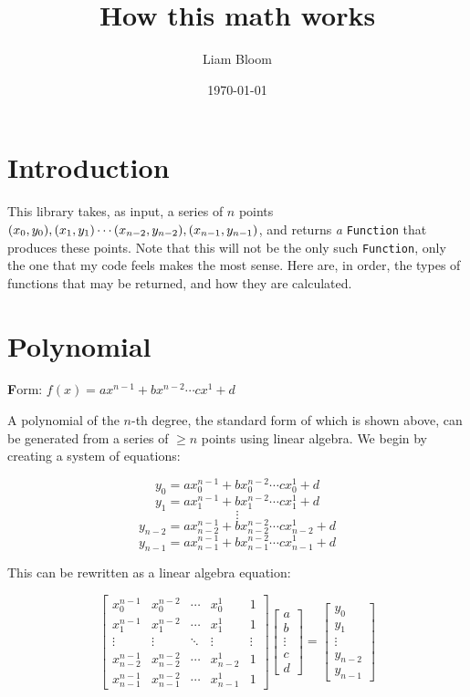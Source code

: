 \documentclass[12pt, letterpaper]{article}
\title{How this math works}
\author{Liam Bloom}
\date{\today}
\begin{document}
\tableofcontents

\section*{Introduction}

This library takes, as input, a series of $n$ points 
\((x_0, y_0), (x_1, y_1)\cdots \\(x_{n-2}, y_{n-2}), 
(x_{n-1}, y_{n-1})\), and returns {\textit a} \verb|Function| that 
produces these points. Note that this will not be the only such
\verb|Function|, only the one that my code feels makes the most sense. 
Here are, in order, the types of functions that may be returned, and
how they are calculated.

\section{Polynomial}

{\textbf Form:} \(f(x)=ax^{n-1}+bx^{n-2}\cdots cx^1+d\) \vspace{2ex}

A polynomial of the $n$-th degree, the standard form of which is shown
above, can be generated from a series of $\geq n$ points using linear
algebra. We begin by creating a system of equations:

\[y_0=ax_0^{n-1}+bx_0^{n-2}\cdots cx_0^1+d\]
\[y_1=ax_1^{n-1}+bx_1^{n-2}\cdots cx_1^1+d\]
\[\vdots\]
\[y_{n-2}=ax_{n-2}^{n-1}+bx_{n-2}^{n-2}\cdots cx_{n-2}^1+d\]
\[y_{n-1}=ax_{n-1}^{n-1}+bx_{n-1}^{n-2}\cdots cx_{n-1}^1+d\]

This can be rewritten as a linear algebra equation:

\[
    \begin{bmatrix} 
    x_0^{n-1} & x_0^{n-2} & \cdots & x_0^1 & 1 \\
    x_1^{n-1} & x_1^{n-2} & \cdots & x_1^1 & 1 \\
    \vdots & \vdots & \ddots & \vdots & \vdots \\
    x_{n-2}^{n-1} & x_{n-2}^{n-2} & \cdots & x_{n-2}^1 & 1 \\
    x_{n-1}^{n-1} & x_{n-1}^{n-2} & \cdots & x_{n-1}^1 & 1
    \end{bmatrix}
    \begin{bmatrix}
    a \\
    b \\
    \vdots \\
    c \\
    d
    \end{bmatrix}
    =
    \begin{bmatrix}
    y_0 \\
    y_1 \\
    \vdots \\
    y_{n-2} \\
    y_{n-1}
    \end{bmatrix}
\]
\end{document}

